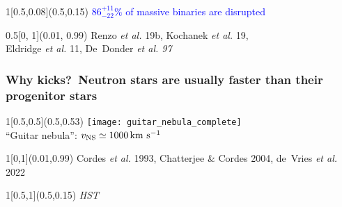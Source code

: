 \documentclass[xcolor=dvipsnames,professionalfonts, aspectratio=169]{beamer}
\begin{document}
\begin{frame}
  \begin{textblock}{1}[0.5,0.08](0.5,0.15)
    \centering\Large \textcolor{Blue}{{\Huge $86^{+11}_{-22}\%$} of massive binaries are
      disrupted}
  \end{textblock}

  \begin{textblock}{0.5}[0, 1](0.01, 0.99) \textcolor{gray!50}{\tiny
      Renzo \emph{et al.} 19b, Kochanek  \emph{et al.} 19,\\[-7pt]
      Eldridge \emph{et al.} 11, De~Donder \emph{et al. 97}}
\end{textblock}

\end{frame}



\begin{frame}[c]
  \frametitle{Why kicks?~Neutron stars are usually faster than their
    progenitor stars}

  \begin{textblock}{1}[0.5,0.5](0.5,0.53)
    \centering
    \texttt{[image: guitar\_nebula\_complete]}\\
    {``Guitar nebula'':  $v_{\rm NS}\simeq1000\,\mathrm{km \ s^{-1}}$}
  \end{textblock}

  \begin{textblock}{1}[0,1](0.01,0.99)
    \textcolor{gray!50}{\tiny Cordes \emph{et al.} 1993, Chatterjee
      \& Cordes 2004, de~Vries \emph{et al.} 2022}
  \end{textblock}
  \begin{textblock}{1}[0.5,1](0.5,0.15)
    \centering \textcolor{gray!50}{\tiny \emph{HST}}
  \end{textblock}


\end{frame}
\end{document}
